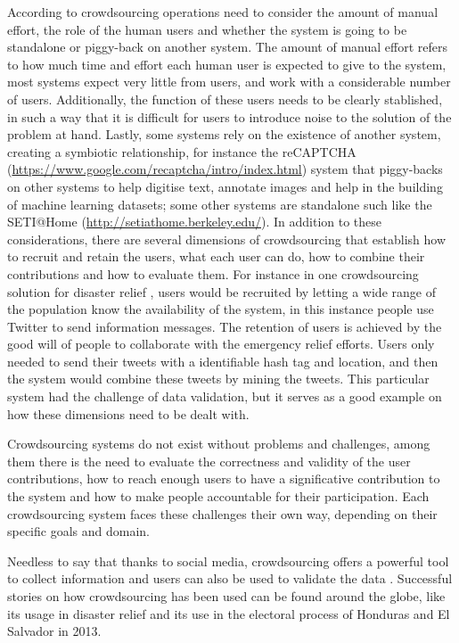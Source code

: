 \documentclass[letterpaper,10pt]{article}
\begin{document}
According to \cite{doan2011} crowdsourcing operations need to consider the amount of manual effort, the role of the human users and whether the system is going to be standalone or piggy-back on another system. The amount of manual effort refers to how much time and effort each human user is expected to give to the system, most systems expect very little from users, and work with a considerable number of users. Additionally, the function of these users needs to be clearly stablished, in such a way that it is difficult for users to introduce noise to the solution of the problem at hand. Lastly, some systems rely on the existence of another system, creating a symbiotic relationship, for instance the reCAPTCHA (\url{https://www.google.com/recaptcha/intro/index.html}) system that piggy-backs on other systems to help digitise text, annotate images and help in the building of machine learning datasets; some other systems are standalone such like the SETI@Home (\url{http://setiathome.berkeley.edu/}). In addition to these considerations, there are several dimensions of crowdsourcing that establish how to recruit and retain the users, what each user can do, how to combine their contributions and how to evaluate them. For instance in one crowdsourcing solution for disaster relief \citep{gao2011}, users would be recruited by letting a wide range of the population know the availability of the system, in this instance people use Twitter to send information messages. The retention of users is achieved by the good will of people to collaborate with the emergency relief efforts. Users only needed to send their tweets with a identifiable hash tag and location, and then the system would combine these tweets by mining the tweets. This particular system had the challenge of data validation, but it serves as a good example on how these dimensions need to be dealt with.

Crowdsourcing systems do not exist without problems and challenges, among them there is the need to evaluate the correctness and validity of the user contributions, how to reach enough users to have a significative contribution to the system and how to make people accountable for their participation. Each crowdsourcing system faces these challenges their own way, depending on their specific goals and domain.

Needless to say that thanks to social media, crowdsourcing offers a powerful tool to collect information and users can also be used to validate the data \citep{gao2011}. Successful stories on how crowdsourcing has been used can be found around the globe, like its usage in disaster relief \citep{yin2012, gao2011} and its use in the electoral process of Honduras and El Salvador in 2013.
\end{document}
